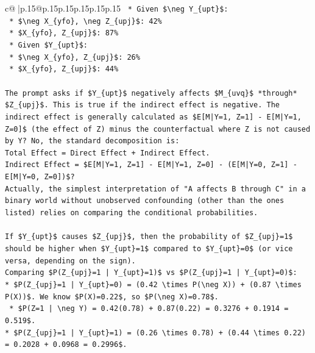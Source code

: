 \documentclass{article}
\begin{document}
{\begin{supertabular}{c@{$\;$}|p{.15\linewidth}@{}p{.15\linewidth}p{.15\linewidth}p{.15\linewidth}p{.15\linewidth}p{.15\linewidth}}
{{{\texttt{    *   Given \$\textbackslash{}neg Y\_\{upt\}\$:} \\
\texttt{        *   \$\textbackslash{}neg X\_\{yfo\}, \textbackslash{}neg Z\_\{upj\}\$: 42\%} \\
\texttt{        *   \$X\_\{yfo\}, Z\_\{upj\}\$: 87\%} \\
\texttt{    *   Given \$Y\_\{upt\}\$:} \\
\texttt{        *   \$\textbackslash{}neg X\_\{yfo\}, Z\_\{upj\}\$: 26\%} \\
\texttt{        *   \$X\_\{yfo\}, Z\_\{upj\}\$: 44\%} \\
\\ 
\texttt{The prompt asks if \$Y\_\{upt\}\$ negatively affects \$M\_\{uvq\}\$ *through* \$Z\_\{upj\}\$. This is true if the indirect effect is negative. The indirect effect is generally calculated as \$E{[}M|Y=1, Z=1{]} {-} E{[}M|Y=1, Z=0{]}\$ (the effect of Z) minus the counterfactual where Z is not caused by Y? No, the standard decomposition is:} \\
\texttt{Total Effect = Direct Effect + Indirect Effect.} \\
\texttt{Indirect Effect = \$E{[}M|Y=1, Z=1{]} {-} E{[}M|Y=1, Z=0{]} {-} (E{[}M|Y=0, Z=1{]} {-} E{[}M|Y=0, Z=0{]})\$?} \\
\texttt{Actually, the simplest interpretation of "A affects B through C" in a binary world without unobserved confounding (other than the ones listed) relies on comparing the conditional probabilities.} \\
\\ 
\texttt{If \$Y\_\{upt\}\$ causes \$Z\_\{upj\}\$, then the probability of \$Z\_\{upj\}=1\$ should be higher when \$Y\_\{upt\}=1\$ compared to \$Y\_\{upt\}=0\$ (or vice versa, depending on the sign).} \\
\texttt{Comparing \$P(Z\_\{upj\}=1 | Y\_\{upt\}=1)\$ vs \$P(Z\_\{upj\}=1 | Y\_\{upt\}=0)\$:} \\
\texttt{*   \$P(Z\_\{upj\}=1 | Y\_\{upt\}=0) = (0.42 \textbackslash{}times P(\textbackslash{}neg X)) + (0.87 \textbackslash{}times P(X))\$. We know \$P(X)=0.22\$, so \$P(\textbackslash{}neg X)=0.78\$.} \\
\texttt{    *   \$P(Z=1 | \textbackslash{}neg Y) = 0.42(0.78) + 0.87(0.22) = 0.3276 + 0.1914 = 0.519\$.} \\
\texttt{*   \$P(Z\_\{upj\}=1 | Y\_\{upt\}=1) = (0.26 \textbackslash{}times 0.78) + (0.44 \textbackslash{}times 0.22) = 0.2028 + 0.0968 = 0.2996\$.} \\
\\ 
}}}
\end{supertabular}}
\end{document}
